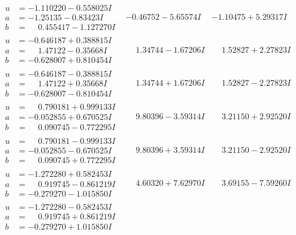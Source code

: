 \documentclass[1p]{elsarticle_modified}
\theoremstyle{definition}
\begin{document}
$$\begin{array}{c|c|c}
\begin{aligned}
u &= -1.110220 - 0.558025 I \\
a &= -1.25135 - 0.83423 I \\
b &= \phantom{-}0.455417 - 1.127270 I\end{aligned}
 & -0.46752 - 5.65574 I & -1.10475 + 5.29317 I \\ \hline\begin{aligned}
u &= -0.646187 + 0.388815 I \\
a &= \phantom{-}1.47122 - 0.35668 I \\
b &= -0.628007 + 0.810454 I\end{aligned}
 & \phantom{-}1.34744 - 1.67206 I & \phantom{-}1.52827 + 2.27823 I \\ \hline\begin{aligned}
u &= -0.646187 - 0.388815 I \\
a &= \phantom{-}1.47122 + 0.35668 I \\
b &= -0.628007 - 0.810454 I\end{aligned}
 & \phantom{-}1.34744 + 1.67206 I & \phantom{-}1.52827 - 2.27823 I \\ \hline\begin{aligned}
u &= \phantom{-}0.790181 + 0.999133 I \\
a &= -0.052855 + 0.670525 I \\
b &= \phantom{-}0.090745 - 0.772295 I\end{aligned}
 & \phantom{-}9.80396 - 3.59314 I & \phantom{-}3.21150 + 2.92520 I \\ \hline\begin{aligned}
u &= \phantom{-}0.790181 - 0.999133 I \\
a &= -0.052855 - 0.670525 I \\
b &= \phantom{-}0.090745 + 0.772295 I\end{aligned}
 & \phantom{-}9.80396 + 3.59314 I & \phantom{-}3.21150 - 2.92520 I \\ \hline\begin{aligned}
u &= -1.272280 + 0.582453 I \\
a &= \phantom{-}0.919745 - 0.861219 I \\
b &= -0.279270 - 1.015850 I\end{aligned}
 & \phantom{-}4.60320 + 7.62970 I & \phantom{-}3.69155 - 7.59260 I \\ \hline\begin{aligned}
u &= -1.272280 - 0.582453 I \\
a &= \phantom{-}0.919745 + 0.861219 I \\
b &= -0.279270 + 1.015850 I\end{aligned}

\end{array}$$
\end{document}
